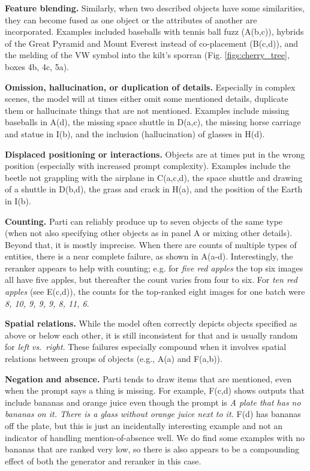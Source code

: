 \textbf{Feature blending.} Similarly, when two described objects have some similarities, they can become fused as one object or the attributes of another are incorporated. Examples included baseballs with tennis ball fuzz (A(b,c)), hybrids of the Great Pyramid and Mount Everest instead of co-placement (B(c,d)), and the melding of the VW symbol into the kilt's sporran (Fig. \ref{figs:cherry_tree}, boxes 4b, 4c, 5a).

\textbf{Omission, hallucination, or duplication of details.} Especially in complex scenes, the model will at times either omit some mentioned details, duplicate them or hallucinate things that are not mentioned. Examples include missing baseballs in A(d), the missing space shuttle in D(a,c), the missing horse carriage and statue in I(b), and the inclusion (hallucination) of glasses in H(d).

\textbf{Displaced positioning or interactions.} Objects are at times put in the wrong position (especially with increased prompt complexity). Examples include the beetle not grappling with the airplane in C(a,c,d), the space shuttle and drawing of a shuttle in D(b,d), the grass and crack in H(a), and the position of the Earth in I(b).

\textbf{Counting.} Parti can reliably produce up to seven objects of the same type (when not also specifying other objects as in panel A or mixing other details). Beyond that, it is mostly imprecise. When there are counts of multiple types of entities, there is a near complete failure, as shown in A(a-d). Interestingly, the reranker appears to help with counting; e.g. for \textit{five red apples} the top six images all have five apples, but thereafter the count varies from four to six. For \textit{ten red apples} (see E(c,d)), the counts for the top-ranked eight images for one batch were \textit{8, 10, 9, 9, 9, 8, 11, 6}.

\textbf{Spatial relations.} While the model often correctly depicts objects specified as above or below each other, it is still inconsistent for that and is usually random for \textit{left} \emph{vs}.\  \textit{right}. These failures especially compound when it involves spatial relations between groups of objects (e.g., A(a) and F(a,b)).

\textbf{Negation and absence.} Parti tends to draw items that are mentioned, even when the prompt says a thing is missing. For example, F(c,d) shows outputs that include bananas and orange juice even though the prompt is \textit{A plate that has no bananas on it. There is a glass without orange juice next to it.} F(d) has bananas off the plate, but this is just an incidentally interesting example and not an indicator of handling mention-of-absence well. We do find some examples with no bananas that are ranked very low, so there is also appears to be a compounding effect of both the generator and reranker in this case.

